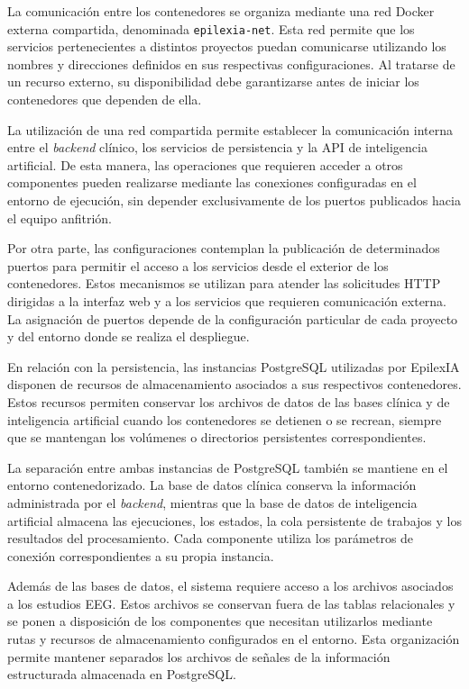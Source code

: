 La comunicación entre los contenedores se organiza mediante
una red Docker externa compartida, denominada
\texttt{epilexia-net}. Esta red permite que los servicios
pertenecientes a distintos proyectos puedan comunicarse
utilizando los nombres y direcciones definidos en sus
respectivas configuraciones. Al tratarse de un recurso
externo, su disponibilidad debe garantizarse antes de
iniciar los contenedores que dependen de ella.

La utilización de una red compartida permite establecer
la comunicación interna entre el \textit{backend} clínico, los
servicios de persistencia y la API de inteligencia
artificial. De esta manera, las operaciones que requieren
acceder a otros componentes pueden realizarse mediante
las conexiones configuradas en el entorno de ejecución,
sin depender exclusivamente de los puertos publicados
hacia el equipo anfitrión.

Por otra parte, las configuraciones contemplan la
publicación de determinados puertos para permitir
el acceso a los servicios desde el exterior de los
contenedores. Estos mecanismos se utilizan para
atender las solicitudes HTTP dirigidas a la interfaz
web y a los servicios que requieren comunicación
externa. La asignación de puertos depende de la
configuración particular de cada proyecto y del
entorno donde se realiza el despliegue.


En relación con la persistencia, las instancias
PostgreSQL utilizadas por EpilexIA disponen de
recursos de almacenamiento asociados a sus
respectivos contenedores. Estos recursos permiten
conservar los archivos de datos de las bases clínica
y de inteligencia artificial cuando los contenedores
se detienen o se recrean, siempre que se mantengan
los volúmenes o directorios persistentes
correspondientes.


La separación entre ambas instancias de PostgreSQL
también se mantiene en el entorno contenedorizado.
La base de datos clínica conserva la información
administrada por el \textit{backend}, mientras que la base
de datos de inteligencia artificial almacena las
ejecuciones, los estados, la cola persistente de
trabajos y los resultados del procesamiento.
Cada componente utiliza los parámetros de conexión
correspondientes a su propia instancia.

Además de las bases de datos, el sistema requiere
acceso a los archivos asociados a los estudios EEG.
Estos archivos se conservan fuera de las tablas
relacionales y se ponen a disposición de los
componentes que necesitan utilizarlos mediante
rutas y recursos de almacenamiento configurados
en el entorno. Esta organización permite mantener
separados los archivos de señales de la información
estructurada almacenada en PostgreSQL.


